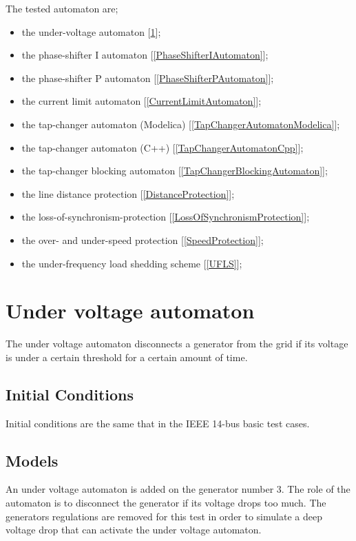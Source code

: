 \documentclass[a4paper, 12pt]{report}
\begin{document}
The tested automaton are;
\begin{itemize}
\item the under-voltage automaton [\ref{UnderVoltageAutomaton}];
\item the phase-shifter I automaton [\ref{PhaseShifterIAutomaton}];
\item the phase-shifter P automaton [\ref{PhaseShifterPAutomaton}];
\item the current limit automaton [\ref{CurrentLimitAutomaton}];
\item the tap-changer automaton (Modelica) [\ref{TapChangerAutomatonModelica}];
\item the tap-changer automaton (C++) [\ref{TapChangerAutomatonCpp}];
\item the tap-changer blocking automaton [\ref{TapChangerBlockingAutomaton}];
\item the line distance protection [\ref{DistanceProtection}];
\item the loss-of-synchronism-protection [\ref{LossOfSynchronismProtection}];
\item the over- and under-speed protection [\ref{SpeedProtection}];
\item the under-frequency load shedding scheme [\ref{UFLS}];
\end{itemize}


\newpage
\section{Under voltage automaton}
\label{UnderVoltageAutomaton}

The under voltage automaton disconnects a generator from the grid if its voltage is under a certain threshold for a certain amount of time.

\subsection{Initial Conditions}

Initial conditions are the same that in the IEEE 14-bus basic test cases.

\subsection{Models}

An under voltage automaton is added on the generator number 3. The role of the automaton is to disconnect the generator if its voltage drops too much. The generators regulations are removed for this test in order to simulate a deep voltage drop that can activate the under voltage automaton.\\
\end{document}
